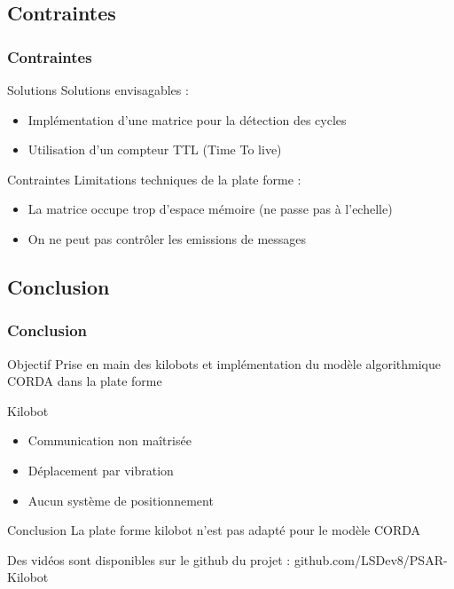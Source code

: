 \documentclass[xcolor=table]{beamer}
\begin{document}
\subsection{Contraintes}
\begin{frame}
  \frametitle{Contraintes}
  \begin{block}{Solutions}
    Solutions envisagables : \\
    \begin{itemize}
      [triangle]
    \item Implémentation d'une matrice pour la détection des cycles
    \item Utilisation d'un compteur TTL (Time To live)
    \end{itemize}
  \end{block}
  \pause
  \begin{block}{Contraintes}
    Limitations techniques de la plate forme :\\
    \begin{itemize}
      [triangle]
    \item La matrice occupe trop d'espace mémoire (ne passe pas à l'echelle)
    \item On ne peut pas contrôler les emissions de messages
    \end{itemize}
  \end{block}
\end{frame}


\subsection{Conclusion}
\begin{frame}
  \frametitle{Conclusion}
  \begin{block}{Objectif}
    Prise en main des kilobots et implémentation du modèle algorithmique CORDA dans la plate forme
  \end{block}
  \begin{block}{Kilobot}
    \begin{itemize}
      [triangle]
    \item Communication non maîtrisée
    \item D\'eplacement par vibration
    \item Aucun système de positionnement
    \end{itemize}
  \end{block}
  \begin{block}{Conclusion}
    La plate forme kilobot n'est pas adapté pour le modèle CORDA
  \end{block}
  Des vidéos sont disponibles sur le github du projet : github.com/LSDev8/PSAR-Kilobot
\end{frame}
\end{document}
